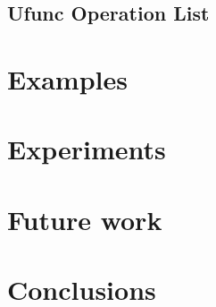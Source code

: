 \documentclass{acm_proc_article-sp}
\begin{document}


\subsection{Ufunc Operation List}




\section{Examples}


\section{Experiments}


\section{Future work}


\section{Conclusions}




\end{document}
